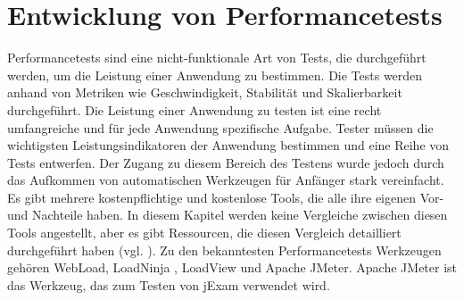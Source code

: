 \section{Entwicklung von Performancetests}

Performancetests sind eine nicht-funktionale Art von Tests, die
durchgeführt werden, um die Leistung einer Anwendung zu bestimmen.
Die Tests werden anhand von Metriken wie Geschwindigkeit, Stabilität
und Skalierbarkeit durchgeführt. Die Leistung einer Anwendung zu testen
ist eine recht umfangreiche und für jede Anwendung spezifische Aufgabe.
Tester müssen die wichtigsten Leistungsindikatoren der Anwendung bestimmen
und eine Reihe von Tests entwerfen. Der Zugang zu diesem Bereich des
Testens wurde jedoch durch das Aufkommen von automatischen Werkzeugen für
Anfänger stark vereinfacht.  Es gibt mehrere kostenpflichtige und kostenlose
Tools, die alle ihre eigenen Vor- und Nachteile haben. In diesem Kapitel
werden keine Vergleiche zwischen diesen Tools angestellt, aber es gibt
Ressourcen, die diesen Vergleich detailliert durchgeführt haben
(vgl. \cite{perfComp}).  Zu den bekanntesten Performancetests Werkzeugen
gehören WebLoad, LoadNinja , LoadView und Apache JMeter. Apache JMeter
ist das Werkzeug, das zum Testen von jExam verwendet wird.


